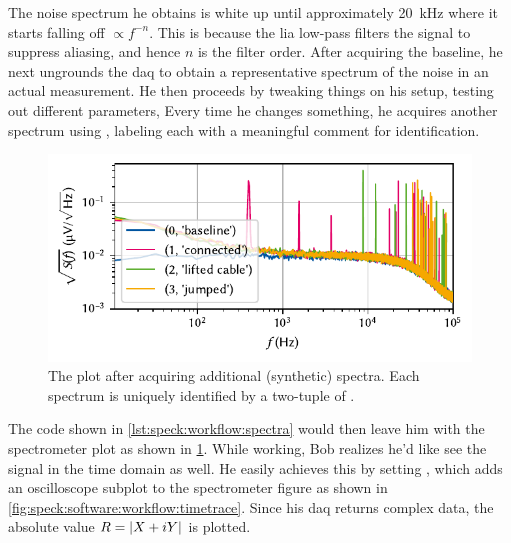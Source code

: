 The noise spectrum he obtains is white up until approximately \qty{20}{\kilo\hertz} where it starts falling off $\propto f^{-n}$.
This is because the \gls{lia} low-pass filters the signal to suppress aliasing, and hence $n$ is the filter order.
After acquiring the baseline, he next ungrounds the \gls{daq} to obtain a representative spectrum of the noise in an actual measurement.
He then proceeds by tweaking things on his setup, testing out different parameters, \etc
Every time he changes something, he acquires another spectrum using , labeling each with a meaningful comment for identification.
\begin{figure}
    \centering
    \includegraphics{img/pdf/spectrometer/workflow_spectra}
    \caption[]{
        The \pyspeck plot after acquiring additional (synthetic) spectra.
        Each spectrum is uniquely identified by a two-tuple of .
    }
    \label{fig:speck:software:workflow:spectra}
\end{figure}
The code shown in \cref{lst:speck:workflow:spectra} would then leave him with the spectrometer plot as shown in \cref{fig:speck:software:workflow:spectra}.
While working, Bob realizes he'd like see the signal in the time domain as well.
He easily achieves this by setting , which adds an oscilloscope subplot to the spectrometer figure as shown in \cref{fig:speck:software:workflow:timetrace}.
Since his \gls{daq} returns complex data, the absolute value $R = \abs{X + i Y}$ is plotted.

